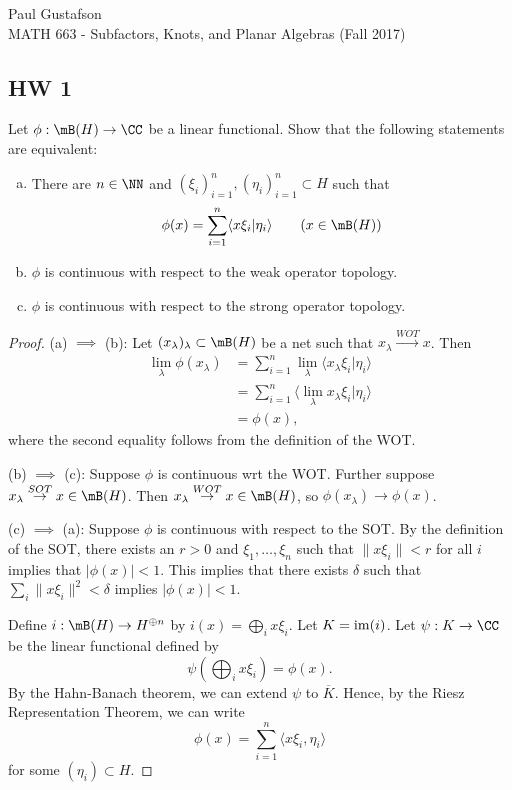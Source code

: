 \documentclass{article}
\begin{document}
\noindent Paul Gustafson\\
\noindent MATH 663 - Subfactors, Knots, and Planar Algebras (Fall 2017)

\subsection*{HW 1}
 Let $\phi: \mB(H) \to \CC$ be a linear functional. Show that the following statements are equivalent:
\begin{enumerate}[(a)]
 \item There are $n \in \NN$ and $(\xi_i)_{i=1}^n, (\eta_i)_{i=1}^n \subset H$ such that
  $$ \phi(x) = \sum_{i=1}^n \langle x \xi_i | \eta_i \rangle \qquad (x \in \mB(H))$$
 \item $\phi$ is continuous with respect to the weak operator topology.
 \item $\phi$ is continuous with respect to the strong operator topology.
\end{enumerate}
\begin{proof}
  (a) $\implies$ (b):  Let $(x_\lambda)_\lambda \subset \mB(H)$ be a net such that $x_\lambda \overset{WOT}{\to} x$. Then
  \begin{align*}
  \lim_\lambda \phi(x_\lambda) & =  \sum_{i=1}^n \lim_\lambda \langle x_\lambda \xi_i | \eta_i \rangle \\
  & = \sum_{i=1}^n \langle \lim_\lambda x_\lambda \xi_i | \eta_i \rangle \\
  & = \phi(x),
  \end{align*}
  where the second equality follows from the definition of the WOT.
  
  (b) $\implies$ (c): Suppose $\phi$ is continuous wrt the WOT. Further suppose $x_\lambda \overset{SOT}{\to} x \in \mB(H)$.
  Then $x_\lambda \overset{WOT}{\to} x \in \mB(H)$, so $\phi(x_\lambda) \to \phi(x)$.

  (c) $\implies$ (a):  Suppose $\phi$ is continuous with respect to the SOT.  By the definition of the SOT, there exists an $r > 0$ and $\xi_1, \ldots, \xi_n$ such that $\|x \xi_i\| < r$ for all $i$ implies that $|\phi(x)| < 1$.   This implies that there exists $\delta$ such that $\sum_i \|x \xi_i\|^2 < \delta$ implies $|\phi(x)| < 1$.
  
  Define $i: \mB(H) \to H^{\oplus n}$ by $i(x) = \bigoplus_i x \xi_i$.  Let $K = \operatorname{im}(i)$. Let $\psi: K \to \CC$ be the linear functional defined by
  $$\psi(\bigoplus_i x \xi_i) = \phi(x).$$ By the Hahn-Banach theorem, we can extend $\psi$ to $\overline K$.  Hence, by the Riesz Representation Theorem, we can write
  $$\phi(x) = \sum_{i=1}^n \langle x \xi_i, \eta_i \rangle $$
for some $(\eta_i) \subset H$.
\end{proof}
\end{document}
